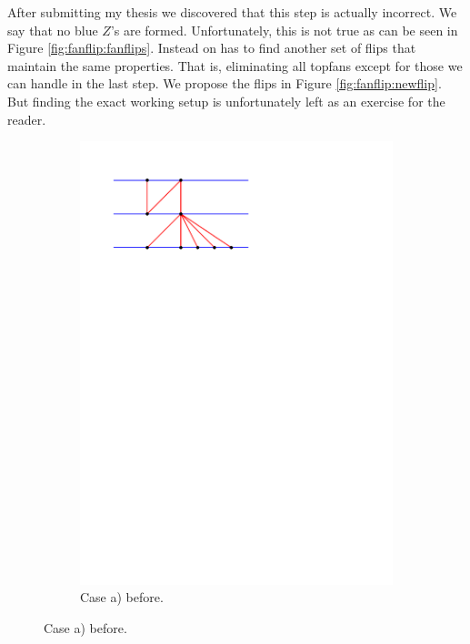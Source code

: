 After submitting my thesis we discovered that this step is actually incorrect. We say that no blue $Z$'s are formed. Unfortunately, this is not true as can be seen in Figure \ref{fig:fanflip:fanflips}. Instead on has to find another set of flips that maintain the same properties. That is, eliminating all topfans except for those we can handle in the last step.
We propose the flips in Figure \ref{fig:fanflip:newflip}. But finding the exact working setup is unfortunately left as an exercise for the reader.



\begin{figure}[!b]
    \centering
    \begin{subfigure}[t]{0.45 \textwidth}
        \includegraphics[width = \textwidth]{topFanFlips/img/newFlip/aBefore.pdf}
        \caption{Case a) before.}
    \end{subfigure}

\end{figure}
